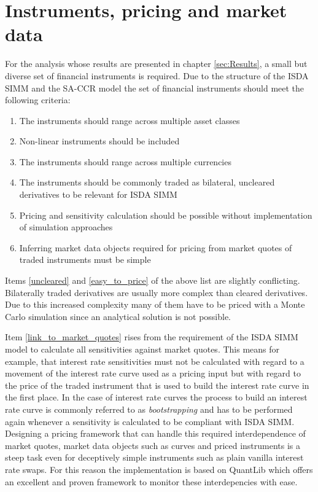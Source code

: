\documentclass[../Thesis_AHoecherl.tex]{subfiles}
\begin{document}
    \section{Instruments, pricing and market data}\label{Instruments, pricing and market data}
    For the analysis whose results are presented in chapter \ref{sec:Results}, a small but diverse set of financial instruments is required. Due to the structure of the \gls{ISDA SIMM} and the \gls{SA-CCR} model the set of financial instruments should meet the following criteria:

    \begin{enumerate}
        \item The instruments should range across multiple asset classes
        \item Non-linear instruments should be included
        \item The instruments should range across multiple currencies
        \item The instruments should be commonly traded as bilateral, uncleared derivatives to be relevant for \gls{ISDA SIMM} \label{uncleared}
        \item Pricing and sensitivity calculation should be possible without implementation of simulation approaches \label{easy_to_price}
        \item Inferring market data objects required for pricing from market quotes of traded instruments must be simple \label{link_to_market_quotes}   
    \end{enumerate}
    
    Items \ref{uncleared} and \ref{easy_to_price} of the above list are slightly conflicting. Bilaterally traded derivatives are usually more complex than cleared derivatives. Due to this increased complexity many of them have to be priced with a Monte Carlo simulation since an analytical solution is not possible.

    Item \ref{link_to_market_quotes} rises from the requirement of the \gls{ISDA SIMM} model to calculate all sensitivities against market quotes. This means for example, that interest rate sensitivities must not be calculated with regard to a movement of the interest rate curve used as a pricing input but with regard to the price of the traded instrument that is used to build the interest rate curve in the first place. In the case of interest rate curves the process to build an interest rate curve is commonly referred to as \emph{bootstrapping} and has to be performed again whenever a sensitivity is calculated to be compliant with \gls{ISDA SIMM}. Designing a pricing framework that can handle this required interdependence of market quotes, market data objects such as curves and priced instruments is a steep task even for deceptively simple instruments such as plain vanilla interest rate swaps. For this reason the implementation is based on QuantLib \cite{QuantLib} which offers an excellent and proven framework to monitor these interdepencies with ease.
\end{document}
